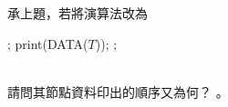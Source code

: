 \ifx\ntpcNinetyThree\undefined[93學年基北區] \fi
\label{ntpc-93-p43} 承上題，若將演算法改為
\begin{algorithm}[h!]
  \begin{algorithmic}
      \State {};
      \State print(DATA($T$));
      \State {};
    \EndIf
  \EndProcedure
  \end{algorithmic}
\end{algorithm}
\\請問其節點資料印出的順序又為何？ \underlineblank{\ref{ntpc-93-p43}}。